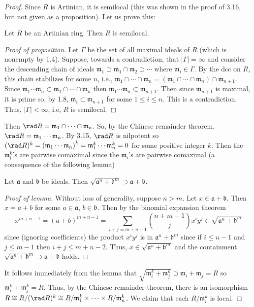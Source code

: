 \begin{proof}
Since $R$ is Artinian, it is semilocal (this was shown in the proof
of 3.16, but not given as a proposition). Let us prove this:
\begin{proposition*}
Let $R$ be an Artinian ring. Then $R$ is semilocal.
\end{proposition*}
\begin{proof}[Proof of proposition]
\renewcommand\qedsymbol{$\clubsuit$}
Let $\Gamma$ be the set of all maximal ideals of $R$ (which is
nonempty by 1.4). Suppose, towards a contradiction, that
$|\Gamma|=\infty$ and consider the descending chain of ideals
$\mathfrak{m}_1\supset\mathfrak{m}_1\cap\mathfrak{m}_2\supset\cdots$
where $\mathfrak{m}_i\in\Gamma$. By the dcc on $R$, this chain
stabilizes for some $n$, i.e.,
$\mathfrak{m}_1\cap\cdots\cap\mathfrak{m}_n=\left(\mathfrak{m}_1\cap\cdots\cap\mathfrak{m}_n\right)\cap\mathfrak{m}_{n+1}$. Since
$\mathfrak{m}_1\cdots\mathfrak{m}_n\subset\mathfrak{m}_1\cap\cdots\cap\mathfrak{m}_n$
then
$\mathfrak{m}_1\cdots\mathfrak{m}_n\subset\mathfrak{m}_{n+1}$. Then
since $\mathfrak{m}_{n+1}$ is maximal, it is prime so, by 1.8,
$\mathfrak{m}_i\subset\mathfrak{m}_{n+1}$ for some $1\leq i\leq
n$. This is a contradiction. Thus, $|\Gamma|<\infty$, i.e, $R$ is
semilocal.
\end{proof}
Then $\rad R=\mathfrak{m}_1\cap\cdots\cap\mathfrak{m}_n$. So, by
the Chinese remainder theorem, $\rad
R=\mathfrak{m}_1\cdots\mathfrak{m}_n$. By 3.15, $\rad R$ is
nilpotent so $(\rad
R)^k=\left(\mathfrak{m}_1\cdots\mathfrak{m}_n\right)^k=\mathfrak{m}_1^k\cdots\mathfrak{m}_n^k=0$
for some positive integer $k$. Then the $\mathfrak{m}_i^k$'s are
pairwise comaximal since the $\mathfrak{m}_i$'s are pairwise
comaximal (a consequence of the following lemma)
\begin{lemma*}
Let $\mathfrak{a}$ and $\mathfrak{b}$ be ideals. Then
$\sqrt{\mathfrak{a}^n+\mathfrak{b}^m}\supset\mathfrak{a}+\mathfrak{b}$.
\end{lemma*}
\begin{proof}[Proof of lemma]
\renewcommand\qedsymbol{$\clubsuit$}
Without loss of generality, suppose $n>m$. Let
$x\in\mathfrak{a}+\mathfrak{b}$. Then $x=a+b$ for some
$a\in\mathfrak{a}$, $b\in\mathfrak{b}$. Then by the binomial
expansion theorem
\[
x^{m+n-1}=(a+b)^{m+n-1}=\sum_{i+j=m+n-1}\binom{n+m-1}{j}x^iy^j\in\sqrt{\mathfrak{a}^n+\mathfrak{b}^m}
\]
since (ignoring coefficients) the product $x^iy^j$ is in
$\mathfrak{a}^n+\mathfrak{b}^m$ since if $i\leq n-1$ and $j\leq
m-1$ then $i+j\leq m+n-2$. Thus,
$x\in\sqrt{\mathfrak{a}^n+\mathfrak{b}^m}$ and the containment
$\sqrt{\mathfrak{a}^n+\mathfrak{b}^m}\supset\mathfrak{a}+\mathfrak{b}$
holds.
\end{proof}
It follows immediately from the lemma that
$\sqrt{\mathfrak{m}_i^k+\mathfrak{m}_j^k}\supset\mathfrak{m}_i+\mathfrak{m}_j=R$
so $\mathfrak{m}_i^k+\mathfrak{m}_j^k=R$. Thus, by the Chinese
remainder theorem, there is an isomorphism $R\cong R/(\rad
R)^k\cong R/\mathfrak{m}_1^k\times\cdots\times
R/\mathfrak{m}_n^k$. We claim that each $R/\mathfrak{m}_i^k$ is
local.


\end{proof}
